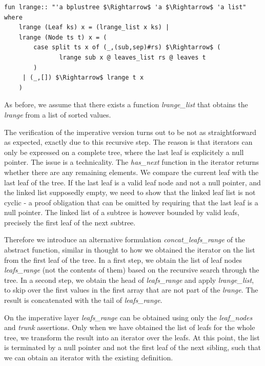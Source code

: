 \documentclass[a4paper,UKenglish,cleveref, autoref, thm-restate]{lipics-v2021}
\begin{document}
\begin{lstlisting}[mathescape=true, language=Isabelle,label=lst:btree-lrange]
fun lrange:: "'a bplustree $\Rightarrow$ 'a $\Rightarrow$ 'a list" where
    lrange (Leaf ks) x = (lrange_list x ks) |
    lrange (Node ts t) x = (
        case split ts x of (_,(sub,sep)#rs) $\Rightarrow$ (
               lrange sub x @ leaves_list rs @ leaves t
        )
     | (_,[]) $\Rightarrow$ lrange t x
    )
\end{lstlisting}
  
As before, we assume that there exists a function \textit{lrange\_list} that
obtains the \emph{lrange} from a list of sorted values.

The verification of the imperative version turns out to be not as straightforward
as expected, exactly due to this recursive step.
The reason is that iterators can only be expressed on a complete tree,
where the last leaf is explicitely a null pointer.
The issue is a technicality. The \textit{has\_next} function
in the iterator returns whether there are any remaining elements.
We compare the current leaf with the last leaf of the tree.
If the last leaf is a valid leaf node and not a null pointer, and
the linked list supposedly empty, we need to show
that the linked leaf list is not cyclic - a proof obligation
that can be omitted by requiring that the last leaf is a null pointer.
The linked list of a subtree is however bounded by valid leafs,
precisely the first leaf of the next subtree.

Therefore we introduce an alternative formulation \emph{concat\_leafs\_range} of the
abstract function, similar in thought to how we obtained the iterator
on the list from the first leaf of the tree.
In a first step, we obtain the list of leaf nodes \emph{leafs\_range} (not the contents of them)
based on the recursive search through the tree.
In a second step, we obtain the head of \emph{leafs\_range} and apply \emph{lrange\_list},
to skip over the first values in the first array that are not part of the \emph{lrange}.
The result is concatenated with the tail of \emph{leafs\_range}.

On the imperative layer \emph{leafs\_range}
can be obtained using only the \emph{leaf\_nodes} and \emph{trunk}
assertions.
Only when we have obtained the list of leafs for the whole tree,
we transform the result into an iterator over the leafs.
At this point, the list is terminated by a null pointer
and not the first leaf of the next sibling,
such that we can obtain an iterator with the existing definition.
\end{document}
